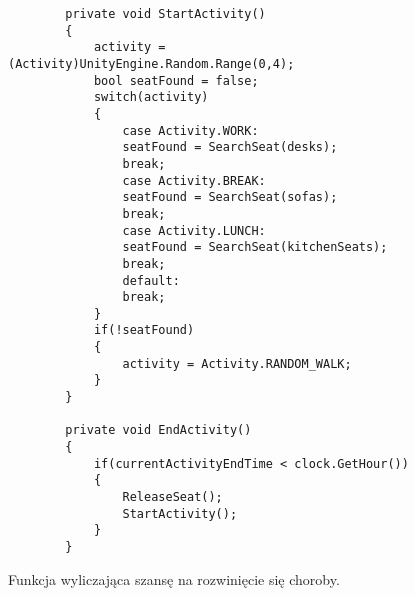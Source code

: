 \begin{figure}
	\begin{lstlisting}
		private void StartActivity()
		{
			activity = (Activity)UnityEngine.Random.Range(0,4);
			bool seatFound = false;
			switch(activity)
			{
				case Activity.WORK:
				seatFound = SearchSeat(desks);
				break;
				case Activity.BREAK:
				seatFound = SearchSeat(sofas);
				break;
				case Activity.LUNCH:
				seatFound = SearchSeat(kitchenSeats);
				break;
				default:
				break;
			}
			if(!seatFound)
			{
				activity = Activity.RANDOM_WALK;
			}
		}
		
		private void EndActivity()
		{
			if(currentActivityEndTime < clock.GetHour())
			{
				ReleaseSeat();
				StartActivity();
			}
		}
	\end{lstlisting}
	\caption{Funkcja wyliczająca szansę na rozwinięcie się choroby.}
	\label{fig:kod:Activity}
\end{figure}



